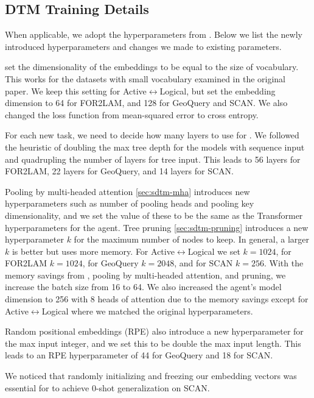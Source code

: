 \subsection{DTM Training Details} \label{sec:sdtm-dtm-training}
When applicable, we adopt the hyperparameters from \citet{Soulos_2023_DifferentiableTreeOperations}. Below we list the newly introduced hyperparameters and changes we made to existing parameters.

\citet{Soulos_2023_DifferentiableTreeOperations} set the dimensionality of the embeddings to be equal to the size of vocabulary. This works for the datasets with small vocabulary examined in the original paper. We keep this setting for Active$\leftrightarrow$Logical, but set the embedding dimension to 64 for FOR2LAM, and 128 for GeoQuery and SCAN. We also changed the loss function from mean-squared error to cross entropy.

For each new task, we need to decide how many layers to use for \sdtm. We followed the heuristic of doubling the max tree depth for the models with sequence input and quadrupling the number of layers for tree input. This leads to 56 layers for FOR2LAM, 22 layers for GeoQuery, and 14 layers for SCAN.

Pooling by multi-headed attention \ref{sec:sdtm-mha} introduces new hyperparameters such as number of pooling heads and pooling key dimensionality, and we set the value of these to be the same as the Transformer hyperparameters for the agent. Tree pruning \ref{sec:sdtm-pruning} introduces a new hyperparameter $k$ for the maximum number of nodes to keep. In general, a larger $k$ is better but uses more memory. For Active$\leftrightarrow$Logical we set $k=1024$, for FOR2LAM $k=1024$, for GeoQuery $k=2048$, and for SCAN $k=256$. With the memory savings from \abvrepname, pooling by multi-headed attention, and pruning, we increase the batch size from 16 to 64. We also increased the agent's model dimension to 256 with 8 heads of attention due to the memory savings except for Active$\leftrightarrow$Logical where we matched the original hyperparameters.

Random positional embeddings (RPE) also introduce a new hyperparameter for the max input integer, and we set this to be double the max input length. This leads to an RPE hyperparameter of 44 for GeoQuery and 18 for SCAN.

We noticed that randomly initializing and freezing our embedding vectors was essential for \sdtm to achieve 0-shot generalization on SCAN.

